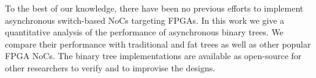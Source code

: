To the best of our knowledge, there have been no previous efforts to implement asynchronous switch-based NoCs targeting FPGAs. 
In this work we give a quantitative analysis of the performance of asynchronous binary trees.
We compare their performance with traditional and fat trees as well as other popular FPGA NoCs.
The binary tree implementations are available as open-source for other researchers to verify and to improvise the designs.
